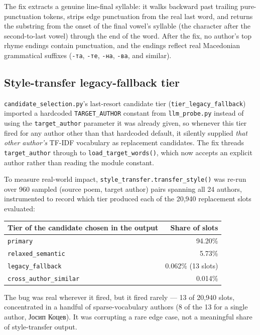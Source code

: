 \documentclass[11pt]{article}
\begin{document}
The fix extracts a genuine line-final syllable: it walks backward past
trailing pure-punctuation tokens, strips edge punctuation from the real
last word, and returns the substring from the onset of the final vowel's
syllable (the character after the second-to-last vowel) through the end of
the word. After the fix, no author's top rhyme endings contain punctuation,
and the endings reflect real Macedonian grammatical suffixes (\texttt{-та},
\texttt{-те}, \texttt{-на}, \texttt{-ва}, and similar).

\subsection{Style-transfer legacy-fallback tier}

\texttt{candidate\_selection.py}'s last-resort candidate tier
(\texttt{tier\_legacy\_fallback}) imported a hardcoded
\texttt{TARGET\_AUTHOR} constant from \texttt{llm\_probe.py} instead of
using the \texttt{target\_author} parameter it was already given, so
whenever this tier fired for any author other than that hardcoded default,
it silently supplied \emph{that other author's} TF-IDF vocabulary as
replacement candidates. The fix threads \texttt{target\_author} through to
\texttt{load\_target\_words()}, which now accepts an explicit author rather
than reading the module constant.

To measure real-world impact, \texttt{style\_transfer.transfer\_style()}
was re-run over 960 sampled (source poem, target author) pairs spanning all
24 authors, instrumented to record which tier produced each of the 20{,}940
replacement slots evaluated:

\begin{center}
\begin{tabular}{lr}
\toprule
Tier of the candidate chosen in the output & Share of slots \\
\midrule
\texttt{primary} & 94.20\% \\
\texttt{relaxed\_semantic} & 5.73\% \\
\texttt{legacy\_fallback} & 0.062\% (13 slots) \\
\texttt{cross\_author\_similar} & 0.014\% \\
\bottomrule
\end{tabular}
\end{center}

The bug was real wherever it fired, but it fired rarely — 13 of 20{,}940
slots, concentrated in a handful of sparse-vocabulary authors (8 of the 13
for a single author, Јосип Коцев). It was corrupting a rare edge case, not a
meaningful share of style-transfer output.
\end{document}
